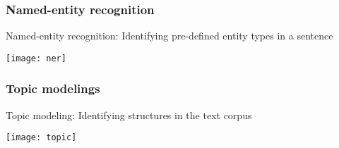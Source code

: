 \begin{frame}[fragile]\frametitle{Named-entity recognition}
Named-entity recognition: Identifying pre-defined entity types in a sentence
\begin{center}
\texttt{[image: ner]}
\end{center}
\end{frame}

\begin{frame}[fragile]\frametitle{Topic modelings}
Topic modeling: Identifying structures in the text corpus

\begin{center}
\texttt{[image: topic]}
\end{center}
\end{frame}




